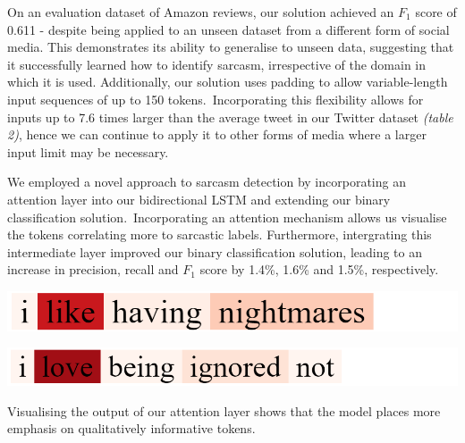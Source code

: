 \documentclass[12pt,a4paper]{article}
\begin{document}
On an evaluation dataset of Amazon reviews, our solution achieved an $F_1$ score of 0.611 - despite being applied to an unseen dataset from a different form of social media. This demonstrates its ability to generalise to unseen data, suggesting that it successfully learned how to identify sarcasm, irrespective of the domain in which it is used. Additionally, our solution uses padding to allow variable-length input sequences of up to 150 tokens.\ Incorporating this flexibility allows for inputs up to 7.6 times larger than the average tweet in our Twitter dataset \textit{(table 2)}, hence we can continue to apply it to other forms of media where a larger input limit may be necessary.

We employed a novel approach to sarcasm detection by incorporating an attention layer into our bidirectional LSTM and extending our binary classification solution.\ Incorporating an attention mechanism allows us visualise the tokens correlating more to sarcastic labels. Furthermore, intergrating this intermediate layer improved our binary classification solution, leading to an increase in precision, recall and $F_1$ score by 1.4\%, 1.6\% and 1.5\%, respectively.\\

\hspace{-5pt}\begin{minipage}{0.5\textwidth}
	\begin{center}
		\hspace{-1cm}\includegraphics[width=1\textwidth]{Images/visualisation1.png}\\
	\end{center}
\end{minipage}
\hspace{-10pt}
\begin{minipage}{0.5\textwidth}
	\begin{center}
		\hspace{-1cm}\includegraphics[width=1\textwidth]{Images/visualisation2.png}\\
	\end{center}	
\end{minipage}\vspace{10pt}
\noindent Visualising the output of our attention layer shows that the model places more emphasis on qualitatively informative tokens.
\end{document}
